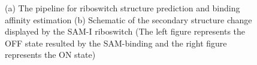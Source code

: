 \documentclass[a4paper,11pt]{article}
\newcommand{\up}{\vspace*{-1em}}
\begin{document}
\begin{figure}
\begin{center}
\end{center}
\up\up
\caption{(a) The pipeline for riboswitch structure prediction and binding affinity estimation (b) Schematic of the secondary structure change displayed by the SAM-I riboswitch (The left figure represents the OFF state resulted by the SAM-binding and the right figure represents the ON state)}
\label{fig:ribo-pipeline}
\up
\end{figure}
\end{document}
